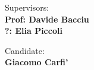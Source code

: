 \begin{titlepage}
\begin{center}
\end{center}
\vspace{15mm}

\begin{minipage}[t]{0.47\textwidth}
	{\large{Supervisors:}{\normalsize\vspace{3mm}
	\bf\\ \large{Prof: Davide Bacciu} \normalsize\vspace{3mm}\bf \\ \large{?: Elia Piccoli}}}
\end{minipage}
\hfill
\begin{minipage}[t]{0.47\textwidth}\raggedleft
	{\large{Candidate:}{\normalsize\vspace{3mm} \bf\\ \large{Giacomo Carfi'}}}
\end{minipage}

\vspace{23mm}
\hrulefill
\\

\end{titlepage}